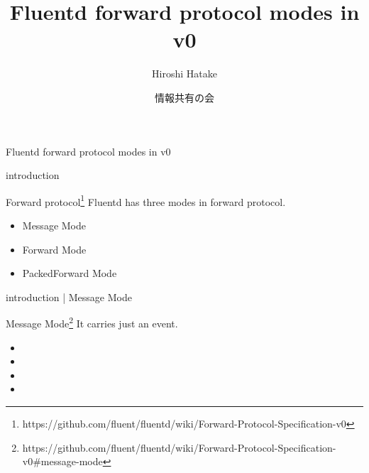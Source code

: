 \documentclass[12pt, unicode]{beamer}
\title{Fluentd forward protocol modes in v0}
\author{Hiroshi Hatake}
\date[2016/04/08]{情報共有の会}
\begin{document}
\frame{\maketitle}

\begin{frame}{Fluentd forward protocol modes in v0}
\end{frame}

\begin{frame}{introduction}
\begin{block}{Forward protocol\footnote[frame]{https://github.com/fluent/fluentd/wiki/Forward-Protocol-Specification-v0}}
Fluentd has three modes in forward protocol.
\end{block}
\begin{itemize}
\item<1-> Message Mode
\item<2-> Forward Mode
\item<3-> PackedForward Mode
\end{itemize}
\end{frame}

\begin{frame}{introduction | Message Mode}
\begin{block}{Message Mode\footnote[frame]{https://github.com/fluent/fluentd/wiki/Forward-Protocol-Specification-v0\#message-mode}}
It carries just an event.
\end{block}
\begin{itemize}
\item {}
\item {}
\item {}
\item {}
\end{itemize}
\end{frame}
\end{document}
